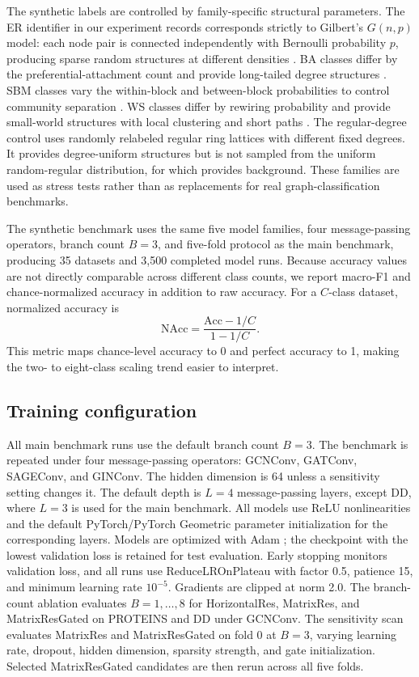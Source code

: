The synthetic labels are controlled by family-specific structural parameters. The ER identifier in our experiment records corresponds strictly to Gilbert's \(G(n,p)\) model: each node pair is connected independently with Bernoulli probability \(p\), producing sparse random structures at different densities \cite{gilbert1959random}. BA classes differ by the preferential-attachment count and provide long-tailed degree structures \cite{barabasi1999emergence}. SBM classes vary the within-block and between-block probabilities to control community separation \cite{holland1983stochastic}. WS classes differ by rewiring probability and provide small-world structures with local clustering and short paths \cite{watts1998collective}. The regular-degree control uses randomly relabeled regular ring lattices with different fixed degrees. It provides degree-uniform structures but is not sampled from the uniform random-regular distribution, for which \cite{wormald1999models} provides background. These families are used as stress tests rather than as replacements for real graph-classification benchmarks.

The synthetic benchmark uses the same five model families, four message-passing operators, branch count \(B=3\), and five-fold protocol as the main benchmark, producing 35 datasets and 3,500 completed model runs. Because accuracy values are not directly comparable across different class counts, we report macro-F1 and chance-normalized accuracy in addition to raw accuracy. For a \(C\)-class dataset, normalized accuracy is
\begin{equation}
\mathrm{NAcc}=\frac{\mathrm{Acc}-1/C}{1-1/C}.
\end{equation}
This metric maps chance-level accuracy to 0 and perfect accuracy to 1, making the two- to eight-class scaling trend easier to interpret.

\subsection{Training configuration}

All main benchmark runs use the default branch count \(B=3\). The benchmark is repeated under four message-passing operators: GCNConv, GATConv, SAGEConv, and GINConv. The hidden dimension is 64 unless a sensitivity setting changes it. The default depth is \(L=4\) message-passing layers, except DD, where \(L=3\) is used for the main benchmark. All models use ReLU nonlinearities and the default PyTorch/PyTorch Geometric parameter initialization for the corresponding layers. Models are optimized with Adam \cite{kingma2014adam}; the checkpoint with the lowest validation loss is retained for test evaluation. Early stopping monitors validation loss, and all runs use ReduceLROnPlateau with factor 0.5, patience 15, and minimum learning rate \(10^{-5}\). Gradients are clipped at norm 2.0. The branch-count ablation evaluates \(B=1,\ldots,8\) for HorizontalRes, MatrixRes, and MatrixResGated on PROTEINS and DD under GCNConv. The sensitivity scan evaluates MatrixRes and MatrixResGated on fold 0 at \(B=3\), varying learning rate, dropout, hidden dimension, sparsity strength, and gate initialization. Selected MatrixResGated candidates are then rerun across all five folds.

